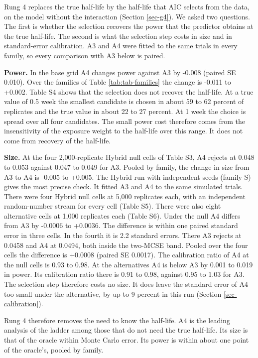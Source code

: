\documentclass[
  11pt,
]{article}
\begin{document}
Rung 4 replaces the true half-life by the half-life that AIC selects
from the data, on the model without the interaction (Section
\ref{sec-g4}). We asked two questions. The first is whether the
selection recovers the power that the predictor obtains at the true
half-life. The second is what the selection step costs in size and in
standard-error calibration. A3 and A4 were fitted to the same trials
in every family, so every comparison with A3 below is paired.

\textbf{Power.} In the base grid A4 changes power against A3 by
-0.008 (paired SE
0.010). Over the families of Table
\ref{tab:tab-families} the change is
-0.011 to +0.002. Table S4 shows that the selection
does not recover the half-life. At a true value of 0.5 week the
smallest candidate is chosen in about
59 to 62
percent of replicates and the true value in about
22 to 27
percent. At 1 week the choice is spread over all four candidates. The
small power cost therefore comes from the insensitivity of the
exposure weight to the half-life over this range. It does not come
from recovery of the half-life.

\textbf{Size.} At the four 2,000-replicate Hybrid null cells of Table S3,
A4 rejects at 0.048 to 0.053 against
0.047 to 0.049 for A3. Pooled by family, the change
in size from A3 to A4 is -0.005 to +0.005. The
Hybrid run with independent seeds (family S) gives the most precise
check. It fitted A3 and A4 to the same simulated trials. There were
four Hybrid null cells at 5,000 replicates each, with an independent
random-number stream for every cell (Table S5). There were also eight
alternative cells at 1,000 replicates each (Table S6). Under the null A4
differs from A3 by
-0.0006 to
+0.0036. The
difference is within one paired standard error in
three
cells. In the fourth it is 2.2 standard errors. There A3 rejects at 0.0458 and A4 at 0.0494, both inside the two-MCSE band.
Pooled over the four cells the difference is
+0.0008 (paired SE
0.0017). The calibration ratio of A4 at the
null cells is
0.93
to 0.98.
At the alternatives A4 is below A3 by
0.001 to
0.019 in power. Its
calibration ratio there is
0.91 to
0.98, against
0.95 to
1.03 for A3. The selection
step therefore costs no size. It does leave the standard error of A4
too small under the alternative, by up to
9
percent in this run (Section \ref{sec-calibration}).

Rung 4 therefore removes the need to know the half-life. A4 is the
leading analysis of the ladder among those that do not need the true
half-life. Its size is that of the oracle within Monte Carlo error.
Its power is within about one point of the oracle's, pooled by
family.
\end{document}
